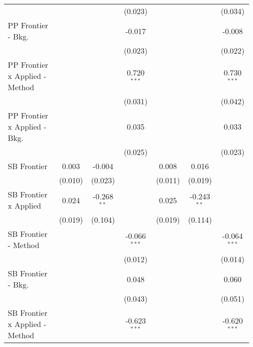 \begin{tabular}{lcccccc}
                                  &             &               & (0.023)        &              &               & (0.034)\\   
   PP Frontier - Bkg.             &             &               & -0.017         &              &               & -0.008\\   
                                  &             &               & (0.023)        &              &               & (0.022)\\   
   PP Frontier x Applied - Method &             &               & 0.720$^{***}$  &              &               & 0.730$^{***}$\\   
                                  &             &               & (0.031)        &              &               & (0.042)\\   
   PP Frontier x Applied - Bkg.   &             &               & 0.035          &              &               & 0.033\\   
                                  &             &               & (0.025)        &              &               & (0.023)\\   
   SB Frontier                    & 0.003       & -0.004        &                & 0.008        & 0.016         &   \\   
                                  & (0.010)     & (0.023)       &                & (0.011)      & (0.019)       &   \\   
   SB Frontier x Applied          & 0.024       & -0.268$^{**}$ &                & 0.025        & -0.243$^{**}$ &   \\   
                                  & (0.019)     & (0.104)       &                & (0.019)      & (0.114)       &   \\   
   SB Frontier - Method           &             &               & -0.066$^{***}$ &              &               & -0.064$^{***}$\\   
                                  &             &               & (0.012)        &              &               & (0.014)\\   
   SB Frontier - Bkg.             &             &               & 0.048          &              &               & 0.060\\   
                                  &             &               & (0.043)        &              &               & (0.051)\\   
   SB Frontier x Applied - Method &             &               & -0.623$^{***}$ &              &               & -0.620$^{***}$\\   

\end{tabular}
